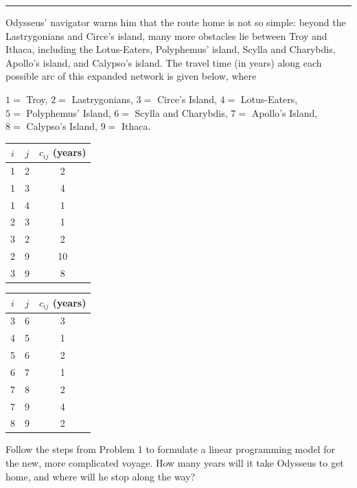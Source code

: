 \documentclass[11pt]{article}
\begin{document}
\hrule
{}

\noindent Odysseus' navigator warns him that the route home is not so simple: beyond the Lastrygonians and Circe's island, many more obstacles lie between Troy and Ithaca, including the Lotus-Eaters, Polyphemus' island, Scylla and Charybdis, Apollo's island, and Calypso's island. The travel time (in years) along each possible arc of this expanded network is given below, where

\begin{center}
$1 = $ Troy, \quad $2 = $ Lastrygonians, \quad $3 = $ Circe's Island, \quad $4 = $ Lotus-Eaters,\\
$5 = $ Polyphemus' Island, \quad $6 = $ Scylla and Charybdis, \quad $7 = $ Apollo's Island,\\
$8 = $ Calypso's Island, \quad $9 = $ Ithaca.
\end{center}

\begin{center}
\begin{minipage}{0.45\textwidth}
\centering
\begin{tabular}{|c|c|c|}
\hline
$i$ & $j$ & $c_{ij}$ (years) \\
\hline
1 & 2 & 2 \\
\hline
1 & 3 & 4 \\
\hline
1 & 4 & 1 \\
\hline
2 & 3 & 1 \\
\hline
3 & 2 & 2 \\
\hline
2 & 9 & 10 \\
\hline
3 & 9 & 8 \\
\hline
\end{tabular}
\end{minipage}%
\hfill
\begin{minipage}{0.45\textwidth}
\centering
\begin{tabular}{|c|c|c|}
\hline
$i$ & $j$ & $c_{ij}$ (years) \\
\hline
3 & 6 & 3 \\
\hline
4 & 5 & 1 \\
\hline
5 & 6 & 2 \\
\hline
6 & 7 & 1 \\
\hline
7 & 8 & 2 \\
\hline
7 & 9 & 4 \\
\hline
8 & 9 & 2 \\
\hline
\end{tabular}
\end{minipage}
\end{center}

\noindent Follow the steps from Problem 1 to formulate a linear programming model for the new, more complicated voyage. How many years will it take Odysseus to get home, and where will he stop along the way?
\end{document}
